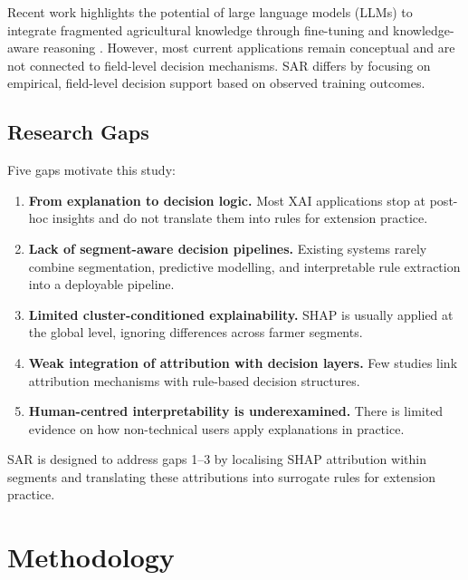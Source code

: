 \documentclass[3p,twocolumn,authoryear]{elsarticle}
\begin{document}
Recent work highlights the potential of large language models (LLMs) to
integrate fragmented agricultural knowledge through fine-tuning and
knowledge-aware reasoning \citep{li2025llm}. However, most current applications
remain conceptual and are not connected to field-level decision mechanisms. SAR
differs by focusing on empirical, field-level decision support based on observed
training outcomes.

\subsection{Research Gaps}

Five gaps motivate this study:

\begin{enumerate}
  \item \textbf{From explanation to decision logic.} Most XAI applications stop
  at post-hoc insights and do not translate them into rules for extension
  practice.

  \item \textbf{Lack of segment-aware decision pipelines.} Existing systems
  rarely combine segmentation, predictive modelling, and interpretable rule
  extraction into a deployable pipeline.

  \item \textbf{Limited cluster-conditioned explainability.} SHAP is usually
  applied at the global level, ignoring differences across farmer segments.

  \item \textbf{Weak integration of attribution with decision layers.} Few
  studies link attribution mechanisms with rule-based decision structures.

  \item \textbf{Human-centred interpretability is underexamined.} There is
  limited evidence on how non-technical users apply explanations in practice.
\end{enumerate}

SAR is designed to address gaps 1--3 by localising SHAP attribution within
segments and translating these attributions into surrogate rules for extension
practice.

\section{Methodology}
\end{document}
